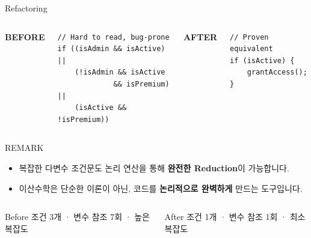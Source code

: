 \documentclass[10.5pt,compress]{beamer}
\begin{document}
\begin{frame}[fragile,t]{Refactoring}
    \footnotesize
    \begin{columns}[T]
        \textbf{\textcolor{codered}{BEFORE}}
\begin{lstlisting}[style=cpp]
// Hard to read, bug-prone
if ((isAdmin && isActive) ||
    (!isAdmin && isActive
             && isPremium) ||
    (isActive && !isPremium))
\end{lstlisting}

        \textbf{\textcolor{codegreen}{AFTER}}
\begin{lstlisting}[style=cpp]
// Proven equivalent
if (isActive) {
    grantAccess();
}
\end{lstlisting}
    \end{columns}

    \vspace{0.02cm}
    \begin{block}{REMARK}
        \scriptsize
        \begin{itemize}\setlength\itemsep{0.1em}
            \item 복잡한 다변수 조건문도 논리 연산을 통해 \textbf{완전한 Reduction}이 가능합니다.
            \item 이산수학은 단순한 이론이 아닌, 코드를 \textbf{논리적으로 완벽하게} 만드는 도구입니다.
        \end{itemize}
    \end{block}

    \vspace{0.04cm}
    \begin{columns}[T]
        \begin{alertblock}{\scriptsize Before}
            \scriptsize 조건 3개 · 변수 참조 7회 · 높은 복잡도
        \end{alertblock}
        \begin{exampleblock}{\scriptsize After}
            \scriptsize 조건 1개 · 변수 참조 1회 · 최소 복잡도
        \end{exampleblock}
    \end{columns}
\end{frame}
\end{document}
